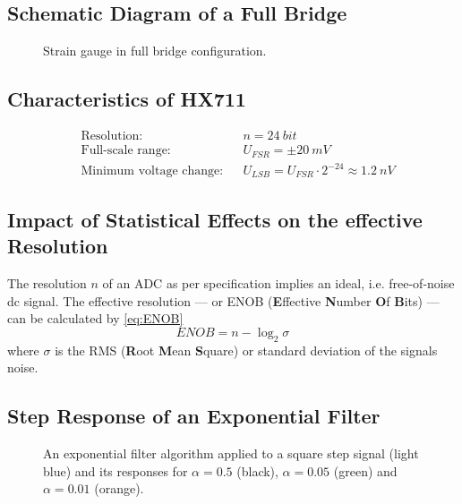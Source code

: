         \subsection{Schematic Diagram of a Full Bridge}\label{sec:A5 schematic diagram full bridge}%
            \begin{figure}[H]
                \centering
                
                \caption[Strain gauge in full bridge configuration]{Strain gauge in full bridge configuration.}
                \label{fig:strain gauge full bridge}
            \end{figure}
        \subsection{Characteristics of HX711}\label{sec:A6 characteristics of the HX711}%
            \begin{align}
                &\text{Resolution:}             &&n = \SI{24}{bit}\\
                &\text{Full-scale range:}       &&U_{FSR} = \pm \SI{20}{mV}\\
                &\text{Minimum voltage change:} &&U_{LSB} = U_{FSR} \cdot 2^{-24} \approx \SI{1.2}{nV}
            \end{align}
        \subsection{Impact of Statistical Effects on the effective Resolution}\label{sec:A7 statistical effects}%
            The resolution \( n \) of an ADC as per specification implies an ideal, i.e. free-of-noise dc signal. The effective resolution —
            or ENOB (\textbf{E}ffective \textbf{N}umber \textbf{O}f \textbf{B}its) — can be calculated by \cref{eq:ENOB}
            \begin{equation}
                ENOB = n - \log_2{\sigma}
                \label{eq:ENOB}
            \end{equation}
            where \( \sigma \) is the RMS (\textbf{R}oot \textbf{M}ean \textbf{S}quare) or standard deviation of the signals noise.
        \subsection{Step Response of an Exponential Filter}\label{sec:A8 step response expo filter}%
            \begin{figure}[H]
                \centering
                
                \caption[Exponential filter applied to square step signal]{An exponential filter algorithm applied to a square step signal (light blue) and its responses
                for \(\alpha = 0.5\) (black), \(\alpha = 0.05\) (green) and \(\alpha = 0.01\) (orange).}
                \label{fig:all step response samples}
            \end{figure}
